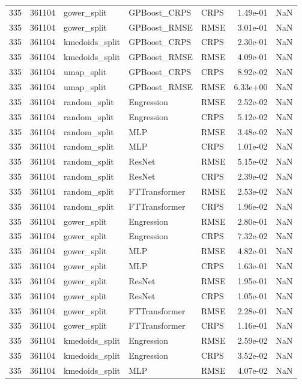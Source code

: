 \begin{tabular}{rrlllrr}
335 & 361104 & gower\_split & GPBoost\_CRPS & CRPS & 1.49e-01 & NaN \\
335 & 361104 & gower\_split & GPBoost\_RMSE & RMSE & 3.01e-01 & NaN \\
335 & 361104 & kmedoids\_split & GPBoost\_CRPS & CRPS & 2.30e-01 & NaN \\
335 & 361104 & kmedoids\_split & GPBoost\_RMSE & RMSE & 4.09e-01 & NaN \\
335 & 361104 & umap\_split & GPBoost\_CRPS & CRPS & 8.92e-02 & NaN \\
335 & 361104 & umap\_split & GPBoost\_RMSE & RMSE & 6.33e+00 & NaN \\
335 & 361104 & random\_split & Engression & RMSE & 2.52e-02 & NaN \\
335 & 361104 & random\_split & Engression & CRPS & 5.12e-02 & NaN \\
335 & 361104 & random\_split & MLP & RMSE & 3.48e-02 & NaN \\
335 & 361104 & random\_split & MLP & CRPS & 1.01e-02 & NaN \\
335 & 361104 & random\_split & ResNet & RMSE & 5.15e-02 & NaN \\
335 & 361104 & random\_split & ResNet & CRPS & 2.39e-02 & NaN \\
335 & 361104 & random\_split & FTTransformer & RMSE & 2.53e-02 & NaN \\
335 & 361104 & random\_split & FTTransformer & CRPS & 1.96e-02 & NaN \\
335 & 361104 & gower\_split & Engression & RMSE & 2.80e-01 & NaN \\
335 & 361104 & gower\_split & Engression & CRPS & 7.32e-02 & NaN \\
335 & 361104 & gower\_split & MLP & RMSE & 4.82e-01 & NaN \\
335 & 361104 & gower\_split & MLP & CRPS & 1.63e-01 & NaN \\
335 & 361104 & gower\_split & ResNet & RMSE & 1.95e-01 & NaN \\
335 & 361104 & gower\_split & ResNet & CRPS & 1.05e-01 & NaN \\
335 & 361104 & gower\_split & FTTransformer & RMSE & 2.28e-01 & NaN \\
335 & 361104 & gower\_split & FTTransformer & CRPS & 1.16e-01 & NaN \\
335 & 361104 & kmedoids\_split & Engression & RMSE & 2.59e-02 & NaN \\
335 & 361104 & kmedoids\_split & Engression & CRPS & 3.52e-02 & NaN \\
335 & 361104 & kmedoids\_split & MLP & RMSE & 4.07e-02 & NaN \\

\end{tabular}

